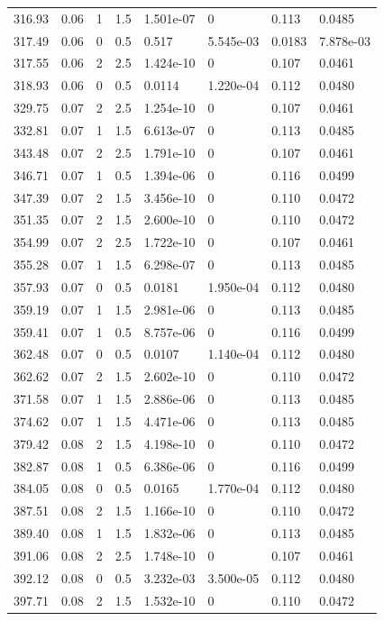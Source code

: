 \documentclass[preview]{standalone}
\begin{document}
{{{\begin{tabular}{L{1.2cm}C{1.2cm} C{0.3cm}C{0.5cm} C{1.4cm}C{1.4cm} C{1.4cm}C{1.4cm}}
  316.93  &  0.06  & 1     & 1.5 &  1.501e-07  & 0  & 0.113 &  0.0485   \\ 
  317.49  &  0.06  & 0     & 0.5 &  0.517  & 5.545e-03  & 0.0183 &  7.878e-03   \\ 
  317.55  &  0.06  & 2     & 2.5 &  1.424e-10  & 0  & 0.107 &  0.0461   \\ 
  318.93  &  0.06  & 0     & 0.5 &  0.0114  & 1.220e-04  & 0.112 &  0.0480   \\ 
  329.75  &  0.07  & 2     & 2.5 &  1.254e-10  & 0  & 0.107 &  0.0461   \\ 
  332.81  &  0.07  & 1     & 1.5 &  6.613e-07  & 0  & 0.113 &  0.0485   \\ 
  343.48  &  0.07  & 2     & 2.5 &  1.791e-10  & 0  & 0.107 &  0.0461   \\ 
  346.71  &  0.07  & 1     & 0.5 &  1.394e-06  & 0  & 0.116 &  0.0499   \\ 
  347.39  &  0.07  & 2     & 1.5 &  3.456e-10  & 0  & 0.110 &  0.0472   \\ 
  351.35  &  0.07  & 2     & 1.5 &  2.600e-10  & 0  & 0.110 &  0.0472   \\ 
  354.99  &  0.07  & 2     & 2.5 &  1.722e-10  & 0  & 0.107 &  0.0461   \\ 
  355.28  &  0.07  & 1     & 1.5 &  6.298e-07  & 0  & 0.113 &  0.0485   \\ 
  357.93  &  0.07  & 0     & 0.5 &  0.0181  & 1.950e-04  & 0.112 &  0.0480   \\ 
  359.19  &  0.07  & 1     & 1.5 &  2.981e-06  & 0  & 0.113 &  0.0485   \\ 
  359.41  &  0.07  & 1     & 0.5 &  8.757e-06  & 0  & 0.116 &  0.0499   \\ 
  362.48  &  0.07  & 0     & 0.5 &  0.0107  & 1.140e-04  & 0.112 &  0.0480   \\ 
  362.62  &  0.07  & 2     & 1.5 &  2.602e-10  & 0  & 0.110 &  0.0472   \\ 
  371.58  &  0.07  & 1     & 1.5 &  2.886e-06  & 0  & 0.113 &  0.0485   \\ 
  374.62  &  0.07  & 1     & 1.5 &  4.471e-06  & 0  & 0.113 &  0.0485   \\ 
  379.42  &  0.08  & 2     & 1.5 &  4.198e-10  & 0  & 0.110 &  0.0472   \\ 
  382.87  &  0.08  & 1     & 0.5 &  6.386e-06  & 0  & 0.116 &  0.0499   \\ 
  384.05  &  0.08  & 0     & 0.5 &  0.0165  & 1.770e-04  & 0.112 &  0.0480   \\ 
  387.51  &  0.08  & 2     & 1.5 &  1.166e-10  & 0  & 0.110 &  0.0472   \\ 
  389.40  &  0.08  & 1     & 1.5 &  1.832e-06  & 0  & 0.113 &  0.0485   \\ 
  391.06  &  0.08  & 2     & 2.5 &  1.748e-10  & 0  & 0.107 &  0.0461   \\ 
  392.12  &  0.08  & 0     & 0.5 &  3.232e-03  & 3.500e-05  & 0.112 &  0.0480   \\ 
  397.71  &  0.08  & 2     & 1.5 &  1.532e-10  & 0  & 0.110 &  0.0472   \\ 
\hline 
\end{tabular} 

}}}
\end{document}
